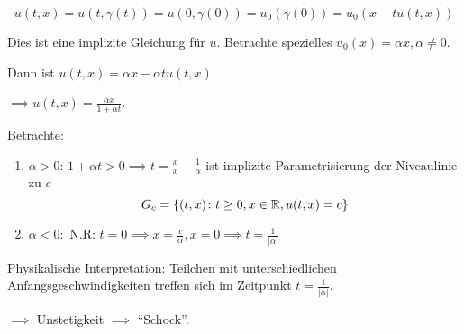 $$
u(t,x) = u(t, \gamma(t)) = u(0, \gamma(0)) = u_0(\gamma(0)) = u_0(x - tu(t,x))
$$

\begin{bem}
  Dies ist eine implizite Gleichung für $u$.
  Betrachte spezielles $u_0(x) = \alpha x, \alpha \neq 0$.

  Dann ist $u(t,x) = \alpha x - \alpha t u(t,x)$

  $\implies u(t,x) = \frac{\alpha x}{1 + \alpha t}$.

  Betrachte: 

  \begin{enumerate}[1)]
    \item $\alpha > 0$: $1 + \alpha t > 0 \implies t = \frac{x}{x} - \frac{1}{\alpha}$ ist implizite Parametrisierung der Niveaulinie zu $c$
      $$G_c = \{(t,x) \colon t \geq 0, x \in \mathbb{R}, u(t,x) = c\}$$

    \item $\alpha < 0: $ N.R: $ t = 0 \implies x = \frac{c}{\alpha}, x = 0 \implies t = \frac{1}{|\alpha|}$
  \end{enumerate}

  Physikalische Interpretation: Teilchen mit unterschiedlichen Anfangsgeschwindigkeiten treffen sich im Zeitpunkt $t = \frac{1}{|\alpha|}$.

  $\implies$ Unstetigkeit $\implies$ ``Schock''.
\end{bem}
